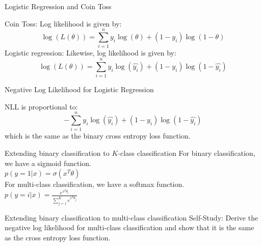 \documentclass{beamer}
\begin{document}
\begin{frame}{Logistic Regression and Coin Toss}

    Coin Toss: Log likelihood is given by:
    $$\log(L(\theta)) = \sum_{i=1}^n y_i\log(\theta) + (1-y_i)\log(1-\theta)$$
    \vspace{10pt}
    \pause 
    Logistic regression: Likewise, log likelihood is given by:
    $$\log(L(\theta)) = \sum_{i=1}^n y_i\log(\hat{y_i}) + (1-y_i)\log(1-\hat{y_i})$$
\end{frame}

\begin{frame}{Negative Log Likelihood for Logistic Regression}
    \begin{tcolorbox}[colback=metropolisblue!5,colframe=metropolisblue,title=Negative Log Likelihood for Logistic Regression]
        NLL is proportional to:
        \begin{equation*}
            -\sum_{i=1}^n y_i\log(\hat{y_i}) + (1-y_i)\log(1-\hat{y_i})
        \end{equation*}
        which is the same as the binary cross entropy loss function.
    \end{tcolorbox}
    
\end{frame}

\begin{frame}{Extending binary classification to $K$-class classification}
    For binary classification, we have a sigmoid function.\\
    $p(y=1|x) = \sigma(x^T\theta)$\\
    \vspace{10pt}
    \pause For multi-class classification, we have a softmax function.\\
    $p(y=i|x) = \frac{e^{x^T\theta_i}}{\sum_{j=1}^Ke^{x^T\theta_j}}$\\

    
    
\end{frame}

\begin{frame}{Extending binary classification to multi-class classification}
   Self-Study: Derive the negative log likelihood for multi-class classification and show that it is the same as the cross entropy loss function.

    
\end{frame}
\end{document}
